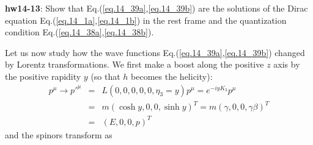 \documentclass[12pt]{article}
\begin{document}
{\bf hw14-13}: Show that Eq.(\ref{eq.14_39a},\ref{eq.14_39b}) are the solutions of the Dirac equation Eq.(\ref{eq.14_1a},\ref{eq.14_1b})
  in the rest frame and the quantization condition Eq.(\ref{eq.14_38a},\ref{eq.14_38b}).

  Let us now study how the wave functions Eq.(\ref{eq.14_39a},\ref{eq.14_39b}) changed by Lorentz transformations.  We first make a boost along the positive $z$ axis by the positive rapidity $y$ (so that $h$ becomes the helicity):
\begin{eqnarray}
  p^\mu \to p'^\mu &=& L(0,0,0,0,0,\eta_3=y) p^\mu
                      = e^{ -iy K_3 } p^\mu  \\
                      &=& m( \cosh y, 0, 0, \sinh y    )^T
                      = m( \gamma,   0, 0, \gamma\beta )^T \\
                      &=& (E,          0, 0, p           )^T \label{eq.14_40}
\end{eqnarray}
 and the spinors transform as
\end{document}
